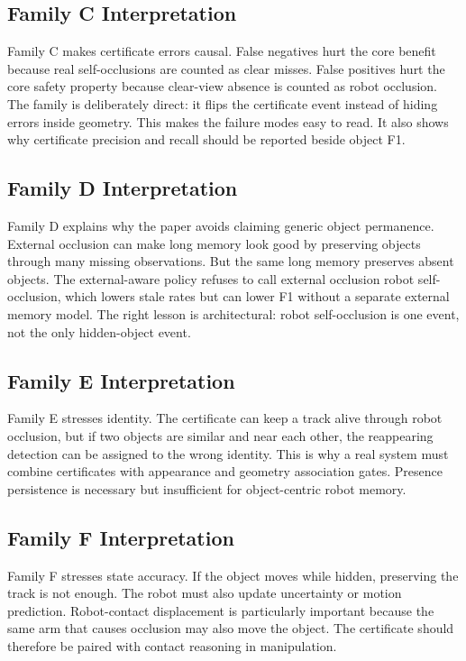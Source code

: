 \documentclass{article}
\begin{document}
\subsection{Family C Interpretation}

Family C makes certificate errors causal. False negatives hurt the core benefit
because real self-occlusions are counted as clear misses. False positives hurt
the core safety property because clear-view absence is counted as robot
occlusion. The family is deliberately direct: it flips the certificate event
instead of hiding errors inside geometry. This makes the failure modes easy to
read. It also shows why certificate precision and recall should be reported
beside object F1.

\subsection{Family D Interpretation}

Family D explains why the paper avoids claiming generic object permanence.
External occlusion can make long memory look good by preserving objects through
many missing observations. But the same long memory preserves absent objects.
The external-aware policy refuses to call external occlusion robot
self-occlusion, which lowers stale rates but can lower F1 without a separate
external memory model. The right lesson is architectural: robot self-occlusion
is one event, not the only hidden-object event.

\subsection{Family E Interpretation}

Family E stresses identity. The certificate can keep a track alive through
robot occlusion, but if two objects are similar and near each other, the
reappearing detection can be assigned to the wrong identity. This is why a
real system must combine certificates with appearance and geometry association
gates. Presence persistence is necessary but insufficient for object-centric
robot memory.

\subsection{Family F Interpretation}

Family F stresses state accuracy. If the object moves while hidden, preserving
the track is not enough. The robot must also update uncertainty or motion
prediction. Robot-contact displacement is particularly important because the
same arm that causes occlusion may also move the object. The certificate should
therefore be paired with contact reasoning in manipulation.
\end{document}
